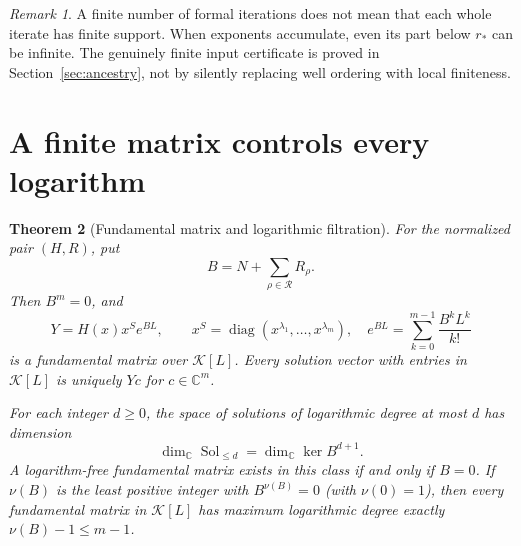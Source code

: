 \documentclass[11pt,a4paper]{article}
\numberwithin{equation}{section}
\newtheorem{theorem}{Theorem}[section]
\theoremstyle{definition}
\theoremstyle{remark}
\newtheorem{remark}[theorem]{Remark}
\newcommand{\C}{\mathbb C}
\newcommand{\K}{\mathcal K}
\newcommand{\Res}{\mathcal R}
\newcommand{\diag}{\operatorname{diag}}
\DeclareMathOperator{\Sol}{Sol}
\begin{document}
\begin{remark}
A finite number of formal iterations does not mean that each whole
iterate has finite support. When exponents accumulate, even its part below
$r_*$ can be infinite. The genuinely finite input certificate is proved
in Section~\ref{sec:ancestry}, not by silently replacing well ordering
with local finiteness.
\end{remark}

\section{A finite matrix controls every logarithm}
\label{sec:logs}

\begin{theorem}[Fundamental matrix and logarithmic filtration]
\label{thm:logs}
For the normalized pair $(H,R)$, put
\begin{equation}\label{eq:B}
 B=N+\sum_{\rho\in\Res}R_\rho.
\end{equation}
Then $B^m=0$, and
\begin{equation}\label{eq:Y}
 Y=H(x)x^S e^{BL},\qquad
 x^S=\diag(x^{\lambda_1},\ldots,x^{\lambda_m}),\quad
 e^{BL}=\sum_{k=0}^{m-1}\frac{B^kL^k}{k!}
\end{equation}
is a fundamental matrix over $\K[L]$. Every solution vector with entries
in $\K[L]$ is uniquely $Yc$ for $c\in\C^m$.

For each integer $d\geq0$, the space of solutions of logarithmic degree
at most $d$ has dimension
\begin{equation}\label{eq:filtration}
 \dim_\C\Sol_{\leq d}=\dim_\C\ker B^{d+1}.
\end{equation}
A logarithm-free fundamental matrix exists in this class if and only if
$B=0$. If $\nu(B)$ is the least positive integer with $B^{\nu(B)}=0$
(with $\nu(0)=1$), then every fundamental matrix in $\K[L]$ has maximum
logarithmic degree exactly $\nu(B)-1\leq m-1$.
\end{theorem}
\end{document}
